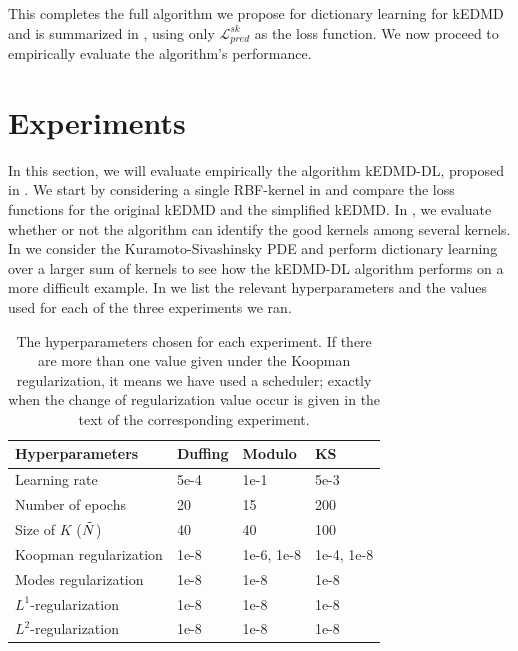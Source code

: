 \documentclass{article}
\begin{document}
This completes the full algorithm we propose for dictionary learning for kEDMD and is summarized in , using only \(\mathcal{L}_{pred}^{sk}\) as the loss function. We now proceed to empirically evaluate the algorithm's performance.




\section{Experiments}\label{sec:experiments}
In this section, we will evaluate empirically the algorithm kEDMD-DL, proposed in . We start by considering a single RBF-kernel in  and compare the loss functions for the original kEDMD and the simplified kEDMD. In , we evaluate whether or not the algorithm can identify the good kernels among several kernels. In  we consider the Kuramoto-Sivashinsky PDE and perform dictionary learning over a larger sum of kernels to see how the kEDMD-DL algorithm performs on a more difficult example. In  we list the relevant hyperparameters and the values used for each of the three experiments we ran.
\begin{table}[ht]
    \caption{The hyperparameters chosen for each experiment. If there are more than one value given under the Koopman regularization, it means we have used a scheduler; exactly when the change of regularization value occur is given in the text of the corresponding experiment.}\label{tab:hyperparameters}
    \centering
    \begin{tabular}{llll}
        \toprule
        Hyperparameters & Duffing& Modulo & KS \\
        \midrule
        Learning rate  & 5e-4 & 1e-1 & 5e-3 \\
        Number of epochs & 20 & 15 & 200 \\
        Size of \(K\) (\(\Tilde N\)) & 40 & 40 & 100 \\
        Koopman regularization & 1e-8 & 1e-6, 1e-8 & 1e-4, 1e-8 \\
        Modes regularization & 1e-8 & 1e-8 & 1e-8 \\
        $L^1$-regularization & 1e-8 & 1e-8 & 1e-8 \\
        $L^2$-regularization & 1e-8 & 1e-8 & 1e-8 \\
        \bottomrule
    \end{tabular}
\end{table}
\end{document}
